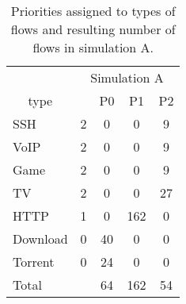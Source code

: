 \begin{table}
	\caption{Priorities assigned to types of flows and resulting number of flows in simulation A.}
	\label{tab:flows_count_A}
	\centering
	
	\begin{tabular}{@{}l|cccc@{}}
		\toprule
		                                 & \multicolumn{4}{|c|}{Simulation A}               \\
		\multicolumn{1}{c|}{type}        &          & P0 & P1  &            P2              \\ \midrule
		SSH                              &    2     & 0  &  0  &             9              \\
		VoIP                             &    2     & 0  &  0  &             9              \\
		Game                             &    2     & 0  &  0  &             9              \\
		TV                               &    2     & 0  &  0  &            27              \\
		HTTP                             &    1     & 0  & 162 &             0              \\
		Download                         &    0     & 40 &  0  &             0              \\
		Torrent                          &    0     & 24 &  0  &             0              \\ \midrule
		Total                            &          & 64 & 162 &            54              \\ \bottomrule
	\end{tabular}
\end{table}